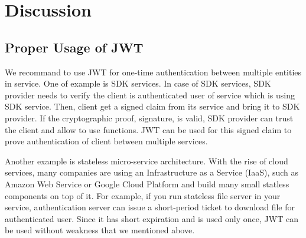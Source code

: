\documentclass[journal,article,submit,moreauthors,pdftex,10pt,a4paper]{mdpi}
\begin{document}



\section{Discussion}
\subsection{Proper Usage of JWT}
We recommand to use JWT for one-time authentication between multiple entities in service. One of example is SDK services. In case of SDK services, SDK provider needs to verify the client is authenticated user of service which is using SDK service. Then, client get a signed claim from its service and bring it to SDK provider. If the cryptographic proof, signature, is valid, SDK provider can trust the client and allow to use functions. JWT can be used for this signed claim to prove authentication of client between multiple services.

Another example is stateless micro-service architecture. With the rise of cloud services, many companies are using an Infrastructure as a Service (IaaS), such as Amazon Web Service or Google Cloud Platform and build many small statless components on top of it. For example, if you run stateless file server in your service, authentication server can issue a short-period ticket to download file for authenticated user. Since it has short expiration and is used only once, JWT can be used without weakness that we mentioned above.
\end{document}
